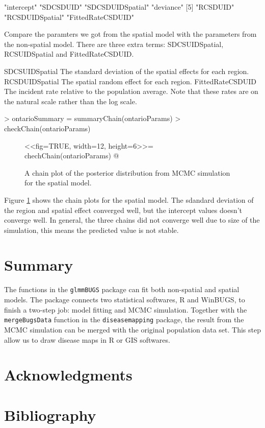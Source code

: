 \documentclass[a4paper]{report}
\begin{document}
\begin{article}
\begin{Schunk}
\begin{Soutput}
[1] "intercept"        "SDCSDUID"         "SDCSDUIDSpatial"  "deviance"        
[5] "RCSDUID"          "RCSDUIDSpatial"   "FittedRateCSDUID"
\end{Soutput}
\end{Schunk}

Compare the paramters we got from the spatial model with the parameters from the non-spatial model. 
There are three extra terms: SDCSUIDSpatial, RCSUIDSpatial and FittedRateCSDUID.

SDCSUIDSpatial     The standard deviation of the spatial effects for each region.
RCSDUIDSpatial     The spatial random effect for each region. 
FittedRateCSDUID   The incident rate relative to the population average. Note that these rates are on the natural scale rather than the log scale. 


\begin{Schunk}
\begin{Sinput}
> ontarioSummary = summaryChain(ontarioParams)
> checkChain(ontarioParams)
\end{Sinput}
\end{Schunk}

\begin{figure}[ht]
 \centering
 <<fig=TRUE, width=12, height=6>>=
 chechChain(ontarioParams)
 @
 \caption{A chain plot of the posterior distribution from MCMC simulation for the spatial model.}\label{chainspatial}
\end{figure}

Figure \ref{chainspatial} shows the chain plots for the spatial model. The sdandard deviation of the region and spatial effect converged well, but the intercept values doesn't converge well. In general, the three chains did not converge well due to size of the simulation, this means the predicted value is not stable.

\section{Summary}
The functions in the \verb!glmmBUGS! package can fit both non-spatial and spatial models. 
The package connects two statistical softwares, R and WinBUGS, to finish a two-step job: model fitting and MCMC simulation. 
Together with the \verb!mergeBugsData! function in the \verb!diseasemapping! package, the result from the MCMC simulation can be merged with the original population data set. This step allow us to draw disease maps in R or GIS softwares. 

\section{Acknowledgments}


\section{Bibliography}
\end{article}
\end{document}
